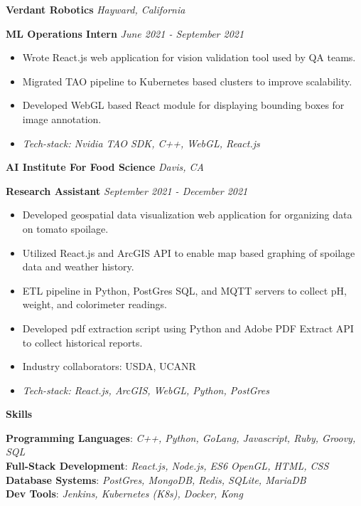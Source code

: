 \documentclass[11pt]{article}
\begin{document}
\vspace{8pt}

\textbf{Verdant Robotics} \hfill \textit{Hayward, California}

\textbf{ML Operations Intern} \hfill \textit{June 2021 - September 2021} 
\begin{itemize}[noitemsep, topsep=0pt, partopsep=0pt, parsep=0pt]
    \item Wrote React.js web application for vision validation tool used by QA teams.
    \item Migrated TAO pipeline to Kubernetes based clusters to improve scalability.
    \item Developed WebGL based React module for displaying bounding boxes for image annotation.
    \item \textit{Tech-stack: Nvidia TAO SDK, C++, WebGL, React.js}
\end{itemize}

\vspace{8pt}

\textbf{AI Institute For Food Science}	\hfill \textit{Davis, CA}

\textbf{Research Assistant} \hfill \textit{September 2021 - December 2021}
\begin{itemize}[noitemsep, topsep=0pt, partopsep=0pt, parsep=0pt]
    \item {Developed geospatial data visualization web application for organizing data on tomato spoilage.}
    \item {Utilized React.js and ArcGIS API to enable map based graphing of spoilage data and weather history.}
    \item {ETL pipeline in Python, PostGres SQL, and MQTT servers to collect pH, weight, and colorimeter readings.}
    \item {Developed pdf extraction script using Python and Adobe PDF Extract API to collect historical reports.}
    \item {Industry collaborators: USDA, UCANR}
    \item \textit{Tech-stack: React.js, ArcGIS, WebGL, Python, PostGres}
\end{itemize}


\begin{center}
    \textbf{Skills}
\end{center}

\textbf{Programming Languages}: \textit{C++, Python, GoLang, Javascript, Ruby, Groovy, SQL}\\
\textbf{Full-Stack Development}: \textit{React.js, Node.js, ES6 OpenGL, HTML, CSS}\\
\textbf{Database Systems}: \textit{PostGres, MongoDB, Redis, SQLite, MariaDB}\\
\textbf{Dev Tools}: \textit{Jenkins, Kubernetes (K8s), Docker, Kong}
\end{document}
